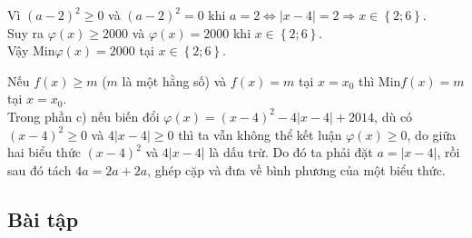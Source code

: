 \begin{vd}
{\begin{enumerate}
			Vì $(a-2)^2\ge 0$ và $(a-2)^2=0$ khi $a=2\Leftrightarrow |x-4|=2\Rightarrow x\in \left\{2;6\right\}$.\\
			Suy ra $\varphi (x)\ge 2000$ và $\varphi (x)=2000$ khi $x\in \left\{2;6\right\}$.\\
			Vậy Min$ \varphi (x)=2000$ tại $x\in \left\{2;6\right\}.$
		\end{enumerate}
	\begin{note}
		Nếu $f(x)\ge m$ ($m$ là một hằng số) và $f(x)=m$ tại $x=x_0$ thì Min$f(x)=m$ tại $x=x_0$.\\
		Trong phần c) nếu biến đổi $\varphi (x)=(x-4)^2-4|x-4|+2014$, dù có $(x-4)^2\ge 0$ và $4|x-4|\ge 0$ thì ta vẫn không thể kết luận $\varphi (x)\ge 0$, do giữa hai biểu thức $(x-4)^2$ và $4|x-4|$ là dấu trừ. Do đó ta phải đặt $a=|x-4|$, rồi sau đó tách $4a=2a+2a$, ghép cặp và đưa về bình phương của một biểu thức.
	\end{note}
	}
\end{vd}

\subsection{Bài tập}
